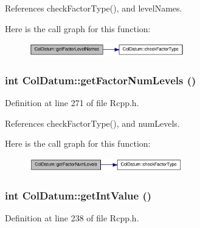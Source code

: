 References checkFactorType(), and levelNames.

Here is the call graph for this function:\nopagebreak
\begin{figure}[H]
\begin{center}
\leavevmode
\includegraphics[width=191pt]{classColDatum_a4376ad852efcf177fad6f168a8f44877_cgraph}
\end{center}
\end{figure}
\hypertarget{classColDatum_a9b5db8254be428e68c61805f02723821}{
\subsubsection[{getFactorNumLevels}]{\setlength{\rightskip}{0pt plus 5cm}int ColDatum::getFactorNumLevels ()}}
\label{classColDatum_a9b5db8254be428e68c61805f02723821}


Definition at line 271 of file Rcpp.h.

References checkFactorType(), and numLevels.

Here is the call graph for this function:\nopagebreak
\begin{figure}[H]
\begin{center}
\leavevmode
\includegraphics[width=189pt]{classColDatum_a9b5db8254be428e68c61805f02723821_cgraph}
\end{center}
\end{figure}
\hypertarget{classColDatum_af498266608526c9db7f865bc66cc5e40}{
\subsubsection[{getIntValue}]{\setlength{\rightskip}{0pt plus 5cm}int ColDatum::getIntValue ()}}
\label{classColDatum_af498266608526c9db7f865bc66cc5e40}


Definition at line 238 of file Rcpp.h.

